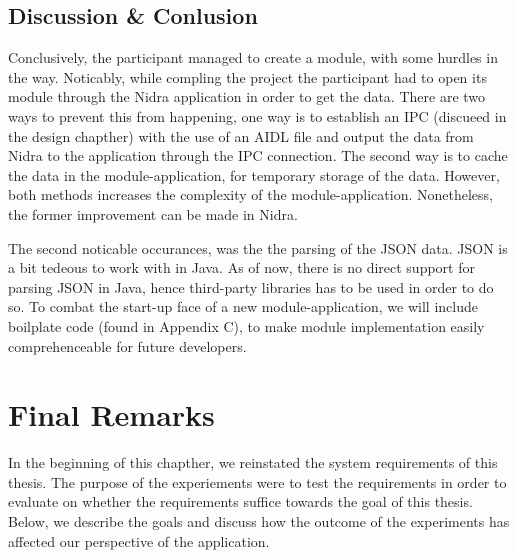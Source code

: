 \subsection{Discussion \& Conlusion}

Conclusively, the participant managed to create a module, with some hurdles in the way. Noticably, while compling the project the participant had to open its module through the Nidra application in order to get the data. There are two ways to prevent this from happening, one way is to establish an IPC (discueed in the design chapther) with the use of an AIDL file and output the data from Nidra to the application through the IPC connection. The second way is to cache the data in the module-application, for temporary storage of the data. However, both methods increases the complexity of the module-application. Nonetheless, the former improvement can be made in Nidra.

The second noticable occurances, was the the parsing of the JSON data. JSON is a bit tedeous to work with in Java. As of now, there is no direct support for parsing JSON in Java, hence third-party libraries has to be used in order to do so. To combat the start-up face of a new module-application, we will include boilplate code (found in Appendix C), to make module implementation easily comprehenceable for future developers.


\section{Final Remarks}
In the beginning of this chapther, we reinstated the system requirements of this thesis. The purpose of the experiements were to test the requirements in order to evaluate on whether the requirements suffice towards the goal of this thesis. Below, we describe the goals and discuss how the outcome of the experiments has affected our perspective of the application.


